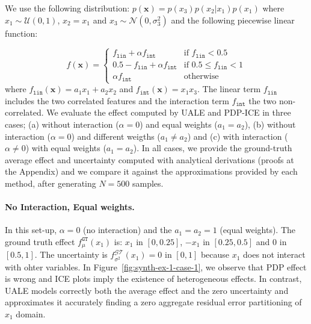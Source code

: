 \documentclass[twoside]{article}
\begin{document}
We use the following distribution:
\(p(\mathbf{x}) = p(x_3)p(x_2|x_1)p(x_1)\) where
\(x_1 \sim \mathcal{U}(0,1)\), \(x_2 = x_1\) and
\(x_3 \sim \mathcal{N}(0, \sigma_3^2)\) and the following piecewise
linear function:

\begin{equation}
  \label{eq:synth-ex-1-function}
  f(\mathbf{x}) = \begin{cases}
                    f_{\mathtt{lin}} + \alpha f_{\mathtt{int}} & \text{if $f_{\mathtt{lin}} < 0.5$ }\\
                    0.5 - f_{\mathtt{lin}} + \alpha f_{\mathtt{int}} & \text{if $0.5 \leq f_{\mathtt{lin}} < 1$}\\
                    \alpha f_{\mathtt{int}} &\text{otherwise}
                  \end{cases}
\end{equation}
%
where \(f_{\mathtt{lin}}(\mathbf{x}) = a_1 x_1 + a_2 x_2\) and
\(f_{\mathtt{int}}(\mathbf{x}) = x_1x_3\). The linear term
\(f_{\mathtt{lin}}\) includes the two correlated features and the
interaction term \(f_{\mathtt{int}}\) the two non-correlated.  We
evaluate the effect computed by UALE and PDP-ICE in three cases; (a)
without interaction (\(\alpha=0\)) and equal weights (\(a_1=a_2\)),
(b) without interaction (\(\alpha=0\)) and different weigths
(\( a_1 \neq a_2 \)) and (c) with interaction (\(\alpha \neq 0\)) with
equal weights (\(a_1=a_2\)). In all cases, we provide the ground-truth
average effect and uncertainty computed with analytical derivations
(proofs at the Appendix) and we compare it against the approximations
provided by each method, after generating \(N=500\) samples.

\paragraph{No Interaction, Equal weights.}

In this set-up, \(\alpha=0\) (no interaction) and the \(a_1=a_2=1\)
(equal weights). The ground truth effect \(f_\mu^{\mathtt{GT}}(x_1)\)
is: \(x_1\) in \([0, 0.25]\), \(-x_1\) in \([0.25, 0.5]\) and \(0\) in
\([0.5, 1]\). The uncertainty is
\(f^{\mathcal{GT}}_{\sigma^2}(x_1) = 0\) in \([0,1]\) because \(x_1\)
does not interact with ohter variables. In
Figure~\ref{fig:synth-ex-1-case-1}, we observe that PDP effect is
wrong and ICE plots imply the existence of heterogeneous effects. In
contrast, UALE models correctly both the average effect and the zero
uncertainty and approximates it accurately finding a zero aggregate
residual error partitioning of \(x_1\) domain.
\end{document}
